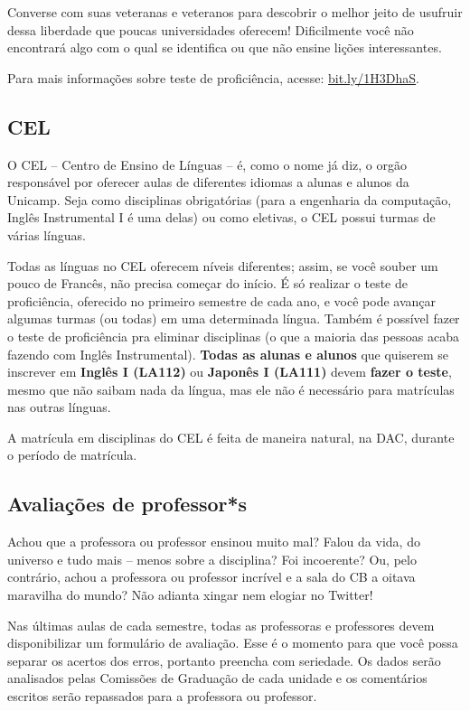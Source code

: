 Converse com suas veteranas e veteranos para descobrir o melhor jeito de
usufruir dessa liberdade que poucas universidades oferecem! Dificilmente você
não encontrará algo com o qual se identifica ou que não ensine lições
interessantes.

Para mais informações sobre teste de proficiência, acesse:
\url{bit.ly/1H3DhaS}.

\subsection{CEL}

O CEL -- Centro de Ensino de Línguas -- é, como o nome já diz, o orgão
responsável por oferecer aulas de diferentes idiomas a alunas e alunos da
Unicamp. Seja como disciplinas obrigatórias (para a engenharia da computação,
Inglês Instrumental I é uma delas) ou como eletivas, o CEL possui turmas de
várias línguas.

Todas as línguas no CEL oferecem níveis diferentes; assim, se você souber um
pouco de Francês, não precisa começar do início. É só realizar o teste de
proficiência, oferecido no primeiro semestre de cada ano, e você pode avançar
algumas turmas (ou todas) em uma determinada língua. Também é possível fazer o
teste de proficiência pra eliminar disciplinas (o que a maioria das pessoas
acaba fazendo com Inglês Instrumental). \textbf{Todas as alunas e alunos} que
quiserem se inscrever em \textbf{Inglês I (LA112)} ou
\textbf{Japonês I (LA111)} devem \textbf{fazer o teste}, mesmo que não saibam
nada da língua, mas ele não é necessário para matrículas nas outras línguas.

A matrícula em disciplinas do CEL é feita de maneira natural, na DAC, durante o
período de matrícula.

\subsection{Avaliações de professor*s}

Achou que a professora ou professor ensinou muito mal? Falou da vida, do
universo e tudo mais -- menos sobre a disciplina? Foi incoerente? Ou, pelo
contrário, achou a professora ou professor incrível e a sala do CB a oitava
maravilha do mundo? Não adianta xingar nem elogiar no Twitter!

Nas últimas aulas de cada semestre, todas as professoras e professores devem
disponibilizar um formulário de avaliação. Esse é o momento para que você possa
separar os acertos dos erros, portanto preencha com seriedade. Os dados serão
analisados pelas Comissões de Graduação de cada unidade e os comentários
escritos serão repassados para a professora ou professor.

